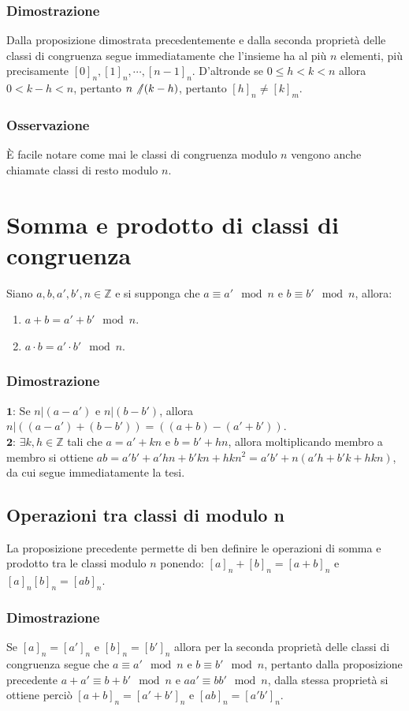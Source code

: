 \subsubsection{Dimostrazione}
Dalla proposizione dimostrata precedentemente e dalla seconda propriet\`a delle classi di congruenza segue immediatamente che l'insieme ha al pi\`u $n$ elementi, pi\`u 
precisamente $[0]_n, [1]_n,\cdots, [n-1]_n$. D'altronde se $0\le h<k<n$ allora $0<k-h<n$, pertanto $n\not/(k-h)$, pertanto $[h]_n\neq[k]_m$.
\subsubsection{Osservazione}
\`E facile notare come mai le classi di congruenza modulo $n$ vengono anche chiamate classi di resto modulo $n$.
\section{Somma e prodotto di classi di congruenza}
Siano $a,b,a',b',n\in\mathbb{Z}$ e si supponga che $a\equiv a'\mod n$ e $b\equiv b'\mod n$, allora:
\begin{enumerate}
\item $a+b=a'+b'\mod n$.
\item $a\cdot b=a'\cdot b'\mod n$.
\end{enumerate}
\subsubsection{Dimostrazione}
$\mathbf{1}$: Se $n|(a-a')$ e $n|(b-b')$, allora $n|((a-a')+(b-b'))=((a+b)-(a'+b'))$.\\
$\mathbf{2}$: $\exists k,h\in\mathbb{Z}$ tali che $a=a'+kn$ e $b=b'+hn$, allora moltiplicando membro a membro si ottiene $ab=a'b'+a'hn+b'kn+hkn^2=a'b'+n(a'h+b'k+hkn)$, da cui 
segue immediatamente la tesi.
\subsection{Operazioni tra classi di modulo n}
La proposizione precedente permette di ben definire le operazioni di somma e prodotto tra le classi modulo $n$ ponendo: $[a]_n+[b]_n=[a+b]_n$ e $[a]_n[b]_n=[ab]_n$.
\subsubsection{Dimostrazione}
Se $[a]_n=[a']_n$ e $[b]_n=[b']_n$ allora per la seconda propriet\`a delle classi di congruenza segue che $a\equiv a'\mod n$ e $b\equiv b'\mod n$, pertanto dalla proposizione
precedente $a+a'\equiv b+b'\mod n$ e $aa'\equiv bb'\mod n$, dalla stessa propriet\`a si ottiene perci\`o $[a+b]_n=[a'+b']_n$ e $[ab]_n=[a'b']_n$.

